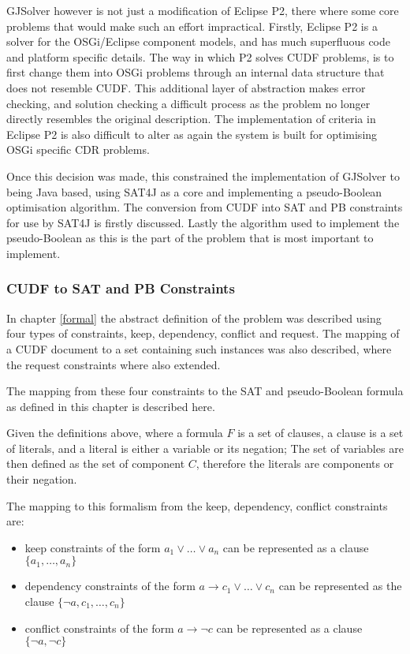 GJSolver however is not just a modification of Eclipse P2, there where some core problems that would make such an effort impractical.
Firstly, Eclipse P2 is a solver for the OSGi/Eclipse component models, and has much superfluous code and platform specific details.
The way in which P2 solves CUDF problems, is to first change them into OSGi problems through an internal data structure that does not resemble CUDF.
This additional layer of abstraction makes error checking, and solution checking a difficult process as the problem no longer directly resembles the original description.
The implementation of criteria in Eclipse P2 is also difficult to alter as again the system is built for optimising OSGi specific CDR problems.

Once this decision was made, this constrained the implementation of GJSolver to being Java based, 
using SAT4J as a core and implementing a pseudo-Boolean optimisation algorithm.
The conversion from CUDF into SAT and PB constraints for use by SAT4J is firstly discussed.
Lastly the algorithm used to implement the pseudo-Boolean as this is the part of the problem that is most important to implement.

\subsubsection{CUDF to SAT and PB Constraints}
In chapter \ref{formal} the abstract definition of the problem was described using four types of constraints, keep, dependency, conflict and request.
The mapping of a CUDF document to a set containing such instances was also described, where the request constraints where also extended.

The mapping from these four constraints to the SAT and pseudo-Boolean formula as defined in this chapter is described here.

Given the definitions above, where a formula $F$ is a set of clauses, a clause is a set of literals, and a literal is either a variable or its negation;
The set of variables are then defined as the set of component $C$, therefore the literals are components or their negation.

The mapping to this formalism from the keep, dependency, conflict constraints are: 
\begin{itemize}
  \item keep constraints of the form $a_1\vee \ldots \vee a_n$  can be represented as a clause $\{a_1,\ldots,a_n\}$
  \item dependency constraints of the form $a \rightarrow c_1 \vee \ldots \vee c_n$ can be represented as the clause $\{\neg a, c_1, \ldots, c_n\}$
  \item conflict constraints of the form $a \rightarrow \neg c$ can be represented as a clause $\{\neg a, \neg c\}$
\end{itemize}

